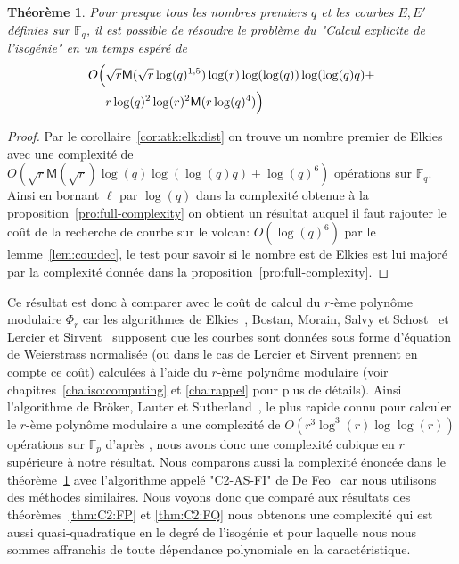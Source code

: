 \documentclass[10pt,a4paper]{book}
\theoremstyle{plain}
\newtheorem{thm}{Théorème}[chapter]
\theoremstyle{definition}
\theoremstyle{definition}
\theoremstyle{definition}
\theoremstyle{definition}
\theoremstyle{definition}
\theoremstyle{remark}
\theoremstyle{remark}
\theoremstyle{definition}
\begin{document}
\begin{thm}
\label{thm:gen:elk:fin}
Pour presque tous les nombres premiers $q$ et les courbes $E,E'$ définies sur 
$\mathbb{F}_q$, il est possible de résoudre le problème du "Calcul explicite de l'isogénie" 
en un temps espéré de 
 \begin{equation*}
 \begin{alignedat}{1}
 O\Bigl( &\sqrt{r}\mathsf{M}(\sqrt{r}\log(q)^{1,5})\log(r)\log(\log(q))\log(\log(q) q) + \\
& r \log(q)^2\log(r)^2 \mathsf{M}(r \log(q)^4) \Bigr)
\end{alignedat}
 \end{equation*}
\end{thm}

\begin{proof}
Par le corollaire~\ref{cor:atk:elk:dist} on trouve un nombre premier de Elkies 
avec une complexité de $O(\sqrt{r}\mathsf{M}(\sqrt{r})\log(q)\log(\log(q) q)+\log(q)^6)$ 
opérations sur $\mathbb{F}_q$.
Ainsi en bornant $\ell$ par $\log(q)$ dans la complexité obtenue à la 
proposition~\ref{pro:full-complexity} on obtient un résultat auquel il faut 
rajouter le coût de la recherche de courbe sur le volcan: $O(\log(q)^6)$ par le 
lemme~\ref{lem:cou:dec}, le test pour savoir si le nombre est de Elkies 
est lui majoré par la complexité donnée dans la 
proposition~\ref{pro:full-complexity}.
\end{proof}

Ce résultat est donc à comparer avec le coût de calcul du $r$-ème polynôme 
modulaire $\Phi_r$ car les algorithmes de Elkies~\cite{Elkies1998}, Bostan, Morain, 
Salvy et Schost~\cite{BMSS08} et Lercier et Sirvent~\cite{Lercier-Sirvent2008}
supposent que les courbes sont données sous forme d'équation de Weierstrass
normalisée (ou dans le cas de Lercier et Sirvent prennent en compte ce coût) 
calculées à l'aide du $r$-ème polynôme modulaire (voir 
chapitres~\ref{cha:iso:computing} et \ref{cha:rappel} pour plus de détails).
Ainsi l'algorithme de Bröker, Lauter et Sutherland~\cite{BLS12}, le plus rapide
connu pour calculer le $r$-ème polynôme modulaire a une complexité de 
$O(r^3 \log^3(r) \log \log(r))$ opérations sur $\mathbb{F}_p$ d'après 
\cite[Theorem 1]{BLS12},  %
nous avons donc une complexité cubique en $r$ supérieure à notre résultat.
Nous comparons aussi la complexité énoncée dans le 
théorème~\ref{thm:gen:elk:fin} avec l'algorithme appelé "C2-AS-FI" de 
De Feo~\cite{DeFeo11} car nous utilisons des méthodes similaires. Nous voyons donc que 
comparé aux résultats des théorèmes~\ref{thm:C2:FP} et \ref{thm:C2:FQ} nous 
obtenons une complexité qui est aussi quasi-quadratique en le degré de 
l'isogénie et pour laquelle nous nous sommes affranchis de toute dépendance polynomiale
en la caractéristique.
\end{document}
